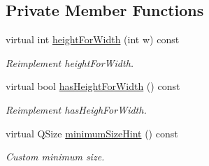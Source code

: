 \subsection*{Private Member Functions}
\begin{DoxyCompactItemize}
\item 
virtual int \hyperlink{classSGCustomPlot_ad60d048905082b37f4a15bd1644f8717}{height\+For\+Width} (int w) const
\begin{DoxyCompactList}\small\item\em Reimplement height\+For\+Width. \end{DoxyCompactList}\item 
virtual bool \hyperlink{classSGCustomPlot_a560baf18b0aa2e31631c603abfa74d47}{has\+Height\+For\+Width} () const
\begin{DoxyCompactList}\small\item\em Reimplement has\+Heigh\+For\+Width. \end{DoxyCompactList}\item 
\mbox{\label{classSGCustomPlot_a2779f4bb4a1b5504c9e4f58bd545df24}} 
virtual Q\+Size \hyperlink{classSGCustomPlot_a2779f4bb4a1b5504c9e4f58bd545df24}{minimum\+Size\+Hint} () const
\begin{DoxyCompactList}\small\item\em Custom minimum size. \end{DoxyCompactList}\end{DoxyCompactItemize}
